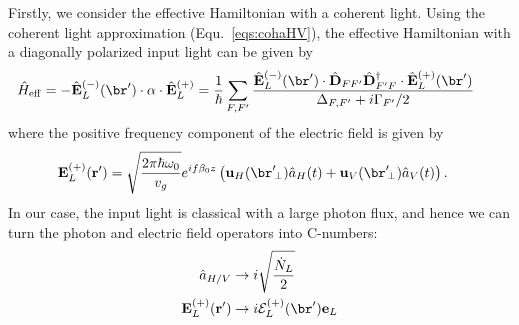 \documentclass[]{report}
\begin{document}
Firstly, we consider the effective Hamiltonian with a coherent light. Using the coherent light approximation (Equ.~\eqref{eqs:cohaHV}), the effective Hamiltonian with a diagonally polarized input light can be given by
\begin{align}
\!\!\!\!\!\!\hat{H}_{\rm eff} &= -\hat{\mathbf{E}}^{(-)}_L(\br')\cdot \alpha \cdot \hat{\mathbf{E}}^{(+)}_L=\frac{1}{\hbar}\sum_{F,F'} \frac{\hat{\mathbf{E}}^{(-)}_L(\br')\cdot \hat{\mathbf{D}}_{FF'}\hat{\mathbf{D}}_{F'F}^\dagger \cdot  \hat{\mathbf{E}}^{(+)}_L(\br')}{\Delta_{F,F'}+i\Gamma_{F'}/2}
\end{align}
where the positive frequency component of the electric field is given by
\begin{align}
\mathbf{E}^{(+)}_L(\mathbf{r}') &= \sqrt{\frac{2\pi\hbar\omega_0}{v_g}}e^{if\beta_0z} \left( \mathbf{u}_H(\br'\!_\perp)\hat{a}_{H}(t) + \mathbf{u}_{V}(\br'\!_\perp)\hat{a}_{V}(t) \right).
\end{align}
In our case, the input light is classical with a large photon flux, and hence we can turn the photon and electric field operators into C-numbers:
\begin{align}
\hat{a}_{H/V} &\rightarrow i\sqrt{\frac{\dot{N}_L}{2}} \\
\mathbf{E}^{(+)}_L(\mathbf{r}') &\rightarrow i\mathcal{E}_L^{(+)}(\br')\mathbf{e}_L  
\end{align}
\end{document}
